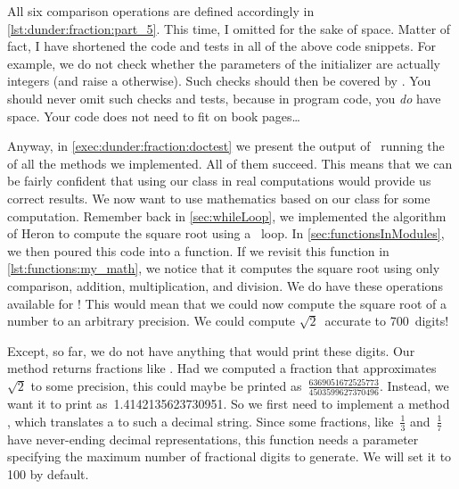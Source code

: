All six comparison operations are defined accordingly in \cref{lst:dunder:fraction:part_5}.
This time, I omitted  for the sake of space.
Matter of fact, I have shortened the code and tests in all of the above code snippets.
For example, we do not check whether the parameters of the initializer  are actually integers (and raise a  otherwise).
Such checks should then be covered by .
You should never omit such checks and tests, because in program code, you \emph{do} have space.
Your code does not need to fit on book pages\dots

Anyway, in \cref{exec:dunder:fraction:doctest} we present the output of \pytest\ running the  of all the methods we implemented.
All of them succeed.
This means that we can be fairly confident that using our  class in real computations would provide us correct results.%
\FloatBarrier%
\endhsection%
%
%
\label{sec:dunder:debugging}%
%
We now want to use mathematics based on our class  for some  computation.
Remember back in \cref{sec:whileLoop}, we implemented the algorithm of Heron to compute the square root using a ~loop.
In \cref{sec:functionsInModules}, we then poured this code into a function.
If we revisit this function  in \cref{lst:functions:my_math}, we notice that it computes the square root using only comparison, addition, multiplication, and division.
We do have these operations available for !
This would mean that we could now compute the square root of a number to an arbitrary precision.
We could compute $\sqrt{2}$~accurate to 700~digits!

Except, so far, we do not have anything that would print these digits.
Our  method returns fractions like .
Had we computed a fraction that approximates~$\sqrt{2}$ to some precision, this could maybe be printed as~$\frac{6369051672525773}{4503599627370496}$.
Instead, we want it to print as~1.4142135623730951.
So we first need to implement a method , which translates a  to such a decimal string.
Since some fractions, like~$\frac{1}{3}$ and~$\frac{1}{7}$ have never-ending decimal representations, this function needs a parameter  specifying the maximum number of fractional digits to generate.
We will set it to 100 by default.

%
%

